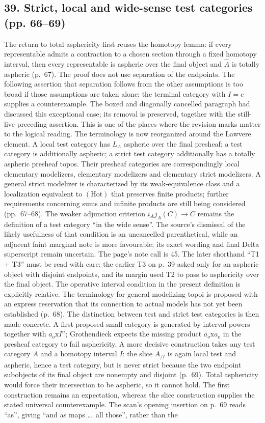 \documentclass[10pt,oneside]{book}
\begin{document}
\subsection*{39. Strict, local and wide-sense test categories (pp. 66--69)}
The return to total asphericity first reuses the homotopy lemma: if every representable admits a contraction to a chosen section through a fixed homotopy interval, then every representable is aspheric over the final object and $\widehat A$ is totally aspheric (p.~67). The proof does not use separation of the endpoints. The following assertion that separation follows from the other assumptions is too broad if those assumptions are taken alone: the terminal category with $I=e$ supplies a counterexample. The boxed and diagonally cancelled paragraph had discussed this exceptional case; its removal is preserved, together with the still-live preceding assertion. This is one of the places where the revision marks matter to the logical reading. The terminology is now reorganized around the Lawvere element. A local test category has $L_A$ aspheric over the final presheaf; a test category is additionally aspheric; a strict test category additionally has a totally aspheric presheaf topos. Their presheaf categories are correspondingly local elementary modelizers, elementary modelizers and elementary strict modelizers. A general strict modelizer is characterized by its weak-equivalence class and a localization equivalent to $(\mathrm{Hot})$ that preserves finite products; further requirements concerning sums and infinite products are still being considered (pp.~67--68). The weaker adjunction criterion $i_Aj_A(C)\to C$ remains the definition of a test category ``in the wide sense''. The source's dismissal of the likely usefulness of that condition is an uncancelled parenthetical, while an adjacent faint marginal note is more favourable; its exact wording and final Delta superscript remain uncertain. The page's note call is 45. The later shorthand ``T1 + T3'' must be read with care: the earlier T3 on p.~39 asked only for an aspheric object with disjoint endpoints, and its margin used T2 to pass to asphericity over the final object. The operative interval condition in the present definition is explicitly relative. The terminology for general modelizing topoi is proposed with an express reservation that its connection to actual models has not yet been established (p.~68). The distinction between test and strict test categories is then made concrete. A first proposed small category is generated by interval powers together with $a_o\mathrm{x}I^n$; Grothendieck expects the missing product $a_o\mathrm{x}a_o$ in the presheaf category to fail asphericity. A more decisive construction takes any test category $A$ and a homotopy interval $I$: the slice $A_{/I}$ is again local test and aspheric, hence a test category, but is never strict because the two endpoint subobjects of its final object are nonempty and disjoint (p.~69). Total asphericity would force their intersection to be aspheric, so it cannot hold. The first construction remains an expectation, whereas the slice construction supplies the stated universal counterexample. The scan's opening insertion on p.~69 reads ``as'', giving ``and as maps \ldots\ all those'', rather than the 
\end{document}
